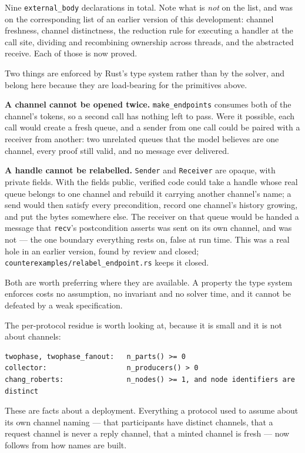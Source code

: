 \documentclass[11pt]{article}
\newcommand{\code}[1]{\texttt{#1}}
\begin{document}
Nine \code{external\_body} declarations in total. Note what is \emph{not} on the
list, and was on the corresponding list of an earlier version of this
development: channel freshness, channel distinctness, the reduction rule for
executing a handler at the call site, dividing and recombining ownership across
threads, and the abstracted receive. Each of those is now proved.

Two things are enforced by Rust's type system rather than by the solver, and
belong here because they are load-bearing for the primitives above.

\textbf{A channel cannot be opened twice.} \code{make\_endpoints} consumes both
of the channel's tokens, so a second call has nothing left to pass. Were it
possible, each call would create a fresh queue, and a sender from one call could
be paired with a receiver from another: two unrelated queues that the model
believes are one channel, every proof still valid, and no message ever
delivered.

\textbf{A handle cannot be relabelled.} \code{Sender} and \code{Receiver} are
opaque, with private fields. With the fields public, verified code could take a
handle whose real queue belongs to one channel and rebuild it carrying another
channel's name; a send would then satisfy every precondition, record one
channel's history growing, and put the bytes somewhere else. The receiver on
that queue would be handed a message that \code{recv}'s postcondition asserts
was sent on its own channel, and was not --- the one boundary everything rests
on, false at run time. This was a real hole in an earlier version, found by
review and closed; \code{counterexamples/relabel\_endpoint.rs} keeps it closed.

Both are worth preferring where they are available. A property the type system
enforces costs no assumption, no invariant and no solver time, and it cannot be
defeated by a weak specification.

The per-protocol residue is worth looking at, because it is small and it is not
about channels:

\begin{lstlisting}
twophase, twophase_fanout:   n_parts() >= 0
collector:                   n_producers() > 0
chang_roberts:               n_nodes() >= 1, and node identifiers are distinct
\end{lstlisting}

These are facts about a deployment. Everything a protocol used to assume about
its own channel naming --- that participants have distinct channels, that a
request channel is never a reply channel, that a minted channel is fresh --- now
follows from how names are built.
\end{document}
